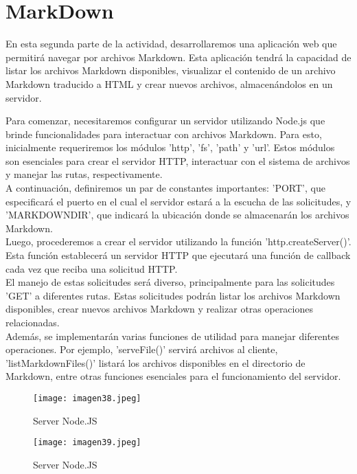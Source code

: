 \documentclass[10pt, a4paper]{article}
\begin{document}
\section*{MarkDown}
	\begin{flushleft}
		En esta segunda parte de la actividad, desarrollaremos una aplicación web que permitirá navegar por archivos Markdown. Esta aplicación tendrá la capacidad de listar los archivos Markdown disponibles, visualizar el contenido de un archivo Markdown traducido a HTML y crear nuevos archivos, almacenándolos en un servidor.	
	\end{flushleft}
	\vspace*{4cm}
	\begin{flushleft}
		Para comenzar, necesitaremos configurar un servidor utilizando Node.js que brinde funcionalidades para interactuar con archivos Markdown. Para esto, inicialmente requeriremos los módulos 'http', 'fs', 'path' y 'url'. Estos módulos son esenciales para crear el servidor HTTP, interactuar con el sistema de archivos y manejar las rutas, respectivamente. \\
		A continuación, definiremos un par de constantes importantes: 'PORT', que especificará el puerto en el cual el servidor estará a la escucha de las solicitudes, y 'MARKDOWNDIR', que indicará la ubicación donde se almacenarán los archivos Markdown. \\
		Luego, procederemos a crear el servidor utilizando la función 'http.createServer()'. Esta función establecerá un servidor HTTP que ejecutará una función de callback cada vez que reciba una solicitud HTTP. \\
		El manejo de estas solicitudes será diverso, principalmente para las solicitudes 'GET' a diferentes rutas. Estas solicitudes podrán listar los archivos Markdown disponibles, crear nuevos archivos Markdown y realizar otras operaciones relacionadas.\\
		Además, se implementarán varias funciones de utilidad para manejar diferentes operaciones. Por ejemplo, 'serveFile()' servirá archivos al cliente, 'listMarkdownFiles()' listará los archivos disponibles en el directorio de Markdown, entre otras funciones esenciales para el funcionamiento del servidor.	
	\end{flushleft}
	\begin{figure}[h]
		\centering
		\texttt{[image: imagen38.jpeg]}
		\caption{Server Node.JS}
	\end{figure}
	\begin{figure}[h]
		\centering
		\texttt{[image: imagen39.jpeg]}
		\caption{Server Node.JS}
	\end{figure}
\end{document}
